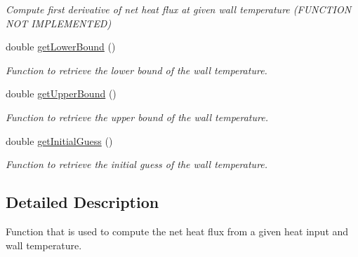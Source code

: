 \begin{DoxyCompactItemize}
\begin{DoxyCompactList}\small\item\em Compute first derivative of net heat flux at given wall temperature (F\+U\+N\+C\+T\+I\+ON N\+OT I\+M\+P\+L\+E\+M\+E\+N\+T\+ED) \end{DoxyCompactList}\item 
double \hyperlink{classtudat_1_1aerodynamics_1_1EquilibriumTemperatureFunction_ae04093a1bd72acd39f2d22e9d47bf297}{get\+Lower\+Bound} ()\hypertarget{classtudat_1_1aerodynamics_1_1EquilibriumTemperatureFunction_ae04093a1bd72acd39f2d22e9d47bf297}{}\label{classtudat_1_1aerodynamics_1_1EquilibriumTemperatureFunction_ae04093a1bd72acd39f2d22e9d47bf297}

\begin{DoxyCompactList}\small\item\em Function to retrieve the lower bound of the wall temperature. \end{DoxyCompactList}\item 
double \hyperlink{classtudat_1_1aerodynamics_1_1EquilibriumTemperatureFunction_a3be24594e7019e225a1fa86a21a66a50}{get\+Upper\+Bound} ()\hypertarget{classtudat_1_1aerodynamics_1_1EquilibriumTemperatureFunction_a3be24594e7019e225a1fa86a21a66a50}{}\label{classtudat_1_1aerodynamics_1_1EquilibriumTemperatureFunction_a3be24594e7019e225a1fa86a21a66a50}

\begin{DoxyCompactList}\small\item\em Function to retrieve the upper bound of the wall temperature. \end{DoxyCompactList}\item 
double \hyperlink{classtudat_1_1aerodynamics_1_1EquilibriumTemperatureFunction_a39fab24957a98060eb1a49295f8e8feb}{get\+Initial\+Guess} ()\hypertarget{classtudat_1_1aerodynamics_1_1EquilibriumTemperatureFunction_a39fab24957a98060eb1a49295f8e8feb}{}\label{classtudat_1_1aerodynamics_1_1EquilibriumTemperatureFunction_a39fab24957a98060eb1a49295f8e8feb}

\begin{DoxyCompactList}\small\item\em Function to retrieve the initial guess of the wall temperature. \end{DoxyCompactList}\end{DoxyCompactItemize}


\subsection{Detailed Description}
Function that is used to compute the net heat flux from a given heat input and wall temperature. 

